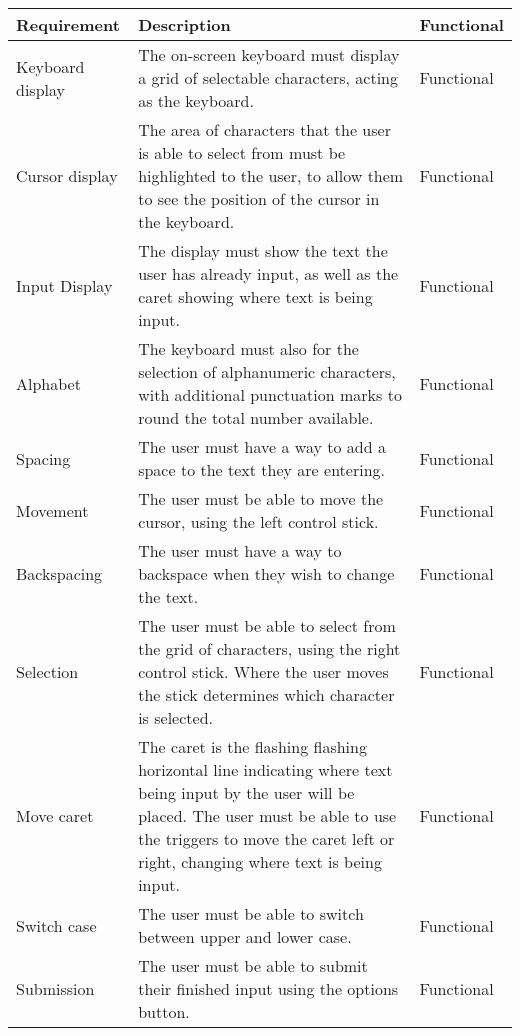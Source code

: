 \documentclass[requirements.tex]{subfiles}
\begin{document}
\begin{table}[H]
\small
\begin{tabularx}{\textwidth}{| l | X | l |}
 \hline
 \textbf{Requirement} & \textbf{Description} & \textbf{Functional} \\
 \hline
 Keyboard display & The on-screen keyboard must display a grid of selectable
 characters, acting as the keyboard. & Functional \\
 \hline
 Cursor display & The area of characters that the user is able to select from
 must be highlighted to the user, to allow them to see the position of the
 cursor in the keyboard. & Functional \\
 \hline
 Input Display & The display must show the text the user has already input, as
 well as the caret showing where text is being input. & Functional \\
 \hline
 Alphabet & The keyboard must also for the selection of alphanumeric characters,
 with additional punctuation marks to round the total number available. &
 Functional \\
 \hline
 Spacing & The user must have a way to add a space to the text they are
 entering. & Functional \\
 \hline
 Movement & The user must be able to move the cursor, using the left control
 stick. & Functional \\
 \hline
 Backspacing & The user must have a way to backspace when they wish to change
 the text. & Functional \\
 \hline
 Selection & The user must be able to select from the grid of characters, using
 the right control stick. Where the user moves the stick determines which
 character is selected. & Functional \\
 \hline
 Move caret & The caret is the flashing flashing horizontal line indicating
 where text being input by the user will be placed. The user must be able to use
 the triggers to move the caret left or right, changing where text is being 
 input. & Functional \\
 \hline
 Switch case & The user must be able to switch between upper and lower case.
 & Functional \\
 \hline
 Submission & The user must be able to submit their finished input using the
 options button. & Functional \\
 \hline
\end{tabularx}
\end{table}
\end{document}
